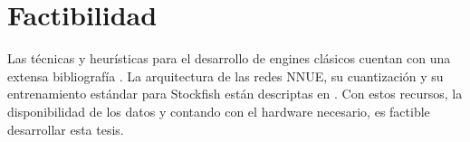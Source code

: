 \section*{Factibilidad}

Las técnicas y heurísticas para el desarrollo de engines clásicos cuentan con una extensa bibliografía \cite{cpw}. La arquitectura de las redes NNUE, su cuantización y su entrenamiento estándar para Stockfish están descriptas en \cite{nnue-pytorch}. Con estos recursos, la disponibilidad de los datos \cite{lichessdb} y contando con el hardware necesario, es factible desarrollar esta tesis.
